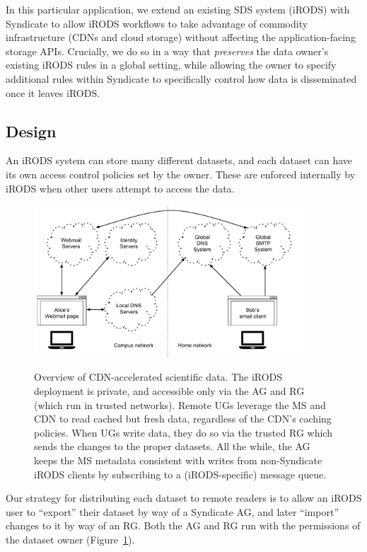 In this particular application, we extend an existing SDS system (iRODS) with
Syndicate to allow iRODS workflows to take advantage of commodity infrastructure
(CDNs and cloud storage) without affecting the application-facing storage APIs.
Crucially, we do so in a way that \emph{preserves} the data owner's existing iRODS
rules in a global setting, while allowing the owner to specify additional
rules within Syndicate to specifically control how data is disseminated once it
leaves iRODS.

\subsection{Design}

An iRODS system can store many different datasets, and each dataset can have its
own access control policies set by the owner.  These are enforced internally by
iRODS when other users attempt to access the data.

\begin{figure}[h]
   \caption{Overview of CDN-accelerated scientific data.  The iRODS deployment
   is private, and accessible only via the AG and RG (which run in trusted
   networks).  Remote UGs leverage the MS and CDN to read cached but fresh data,
   regardless of the CDN's caching policies.  When UGs write data, they do so
   via the trusted RG which sends the changes to the proper datasets.  All the
   while, the AG keeps the MS metadata consistent with writes from non-Syndicate
   iRODS clients by subscribing to a (iRODS-specific) message queue.}
   \centering
   \includegraphics[width=0.9\textwidth,page=25]{figures/dissertation-figures}
   \label{fig:chap4-syndicate-datasets}
\end{figure}

Our strategy for distributing each dataset to remote readers is to allow an
iRODS user to ``export'' their dataset by way of a Syndicate AG, and later
``import'' changes to it by way of an RG.  Both the AG and RG run with the
permissions of the dataset owner (Figure~\ref{fig:chap4-syndicate-datasets}).

